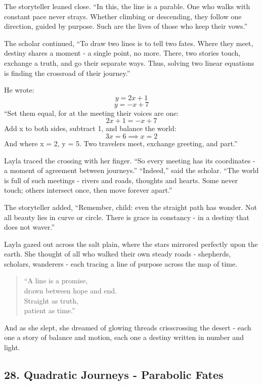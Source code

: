\documentclass[
  letterpaper,
  DIV=11,
  numbers=noendperiod]{scrreprt}
\begin{document}
The storyteller leaned close. ``In this, the line is a parable. One who
walks with constant pace never strays. Whether climbing or descending,
they follow one direction, guided by purpose. Such are the lives of
those who keep their vows.''

The scholar continued, ``To draw two lines is to tell two fates. Where
they meet, destiny shares a moment - a single point, no more. There, two
stories touch, exchange a truth, and go their separate ways. Thus,
solving two linear equations is finding the crossroad of their
journey.''

He wrote: \[
y = 2x + 1
\] \[
y = -x + 7
\] ``Set them equal, for at the meeting their voices are one: \[
2x + 1 = -x + 7
\] Add x to both sides, subtract 1, and balance the world: \[
3x = 6 \implies x = 2
\] And where x = 2, y = 5. Two travelers meet, exchange greeting, and
part.''

Layla traced the crossing with her finger. ``So every meeting has its
coordinates - a moment of agreement between journeys.'' ``Indeed,'' said
the scholar. ``The world is full of such meetings - rivers and roads,
thoughts and hearts. Some never touch; others intersect once, then move
forever apart.''

The storyteller added, ``Remember, child: even the straight path has
wonder. Not all beauty lies in curve or circle. There is grace in
constancy - in a destiny that does not waver.''

Layla gazed out across the salt plain, where the stars mirrored
perfectly upon the earth. She thought of all who walked their own steady
roads - shepherds, scholars, wanderers - each tracing a line of purpose
across the map of time.

\begin{quote}
``A line is a promise,\\
drawn between hope and end.\\
Straight as truth,\\
patient as time.''
\end{quote}

And as she slept, she dreamed of glowing threads crisscrossing the
desert - each one a story of balance and motion, each one a destiny
written in number and light.

\subsection{28. Quadratic Journeys - Parabolic
Fates}\label{quadratic-journeys---parabolic-fates}
\end{document}
